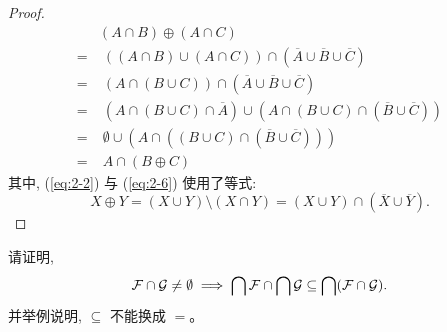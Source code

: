 \documentclass[a4paper, justified]{tufte-handout}
\begin{document}
\begin{proof}
  \setcounter{equation}{0}
  \begin{align}
    &(A \cap B) \oplus (A \cap C) \\
    =&\; ((A \cap B) \cup (A \cap C)) \cap (\overline{A} \cup \overline{B} \cup \overline{C})
      \label{eq:2-2} \\
    =&\; (A \cap (B \cup C)) \cap (\overline{A} \cup \overline{B} \cup \overline{C}) \\
    =&\; (A \cap (B \cup C) \cap \overline{A}) \cup (A \cap (B \cup C) \cap (\overline{B} \cup \overline{C})) \\
    =&\; \emptyset \cup (A \cap ((B \cup C) \cap (\overline{B} \cup \overline{C}))) \\
    =&\; A \cap (B \oplus C)
      \label{eq:2-6}
  \end{align}
  其中, (\ref{eq:2-2}) 与 (\ref{eq:2-6}) 使用了等式:
  \[
    X \oplus Y = (X \cup Y) \setminus (X \cap Y)
               = (X \cup Y) \cap (\overline{X} \cup \overline{Y}).
  \]
\end{proof}

\begin{problem}
  请证明,
  \[
    \mathcal{F} \cap \mathcal{G} \neq \emptyset \implies
      \bigcap \mathcal{F} \cap \bigcap \mathcal{G} \subseteq \bigcap (\mathcal{F} \cap \mathcal{G}).
  \]
  并举例说明, $\subseteq$ 不能换成 $=$。
\end{problem}
\end{document}
